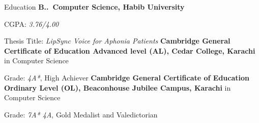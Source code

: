 \begin{rubric}{Education}
\entry*[2020 -- Present]%
	\textbf{B..~Computer Science, Habib University}\par
        CGPA: \emph{3.76/4.00} \par
        Thesis Title: \emph{LipSync Voice for Aphonia Patients }
\entry*[2018 -- 2020]%
	\textbf{Cambridge General Certificate of Education Advanced level (AL), Cedar College, Karachi} in Computer Science
	\par Grade: \emph{4A*}, High Achiever
\entry*[2015 -- 2018]%
	\textbf{Cambridge General Certificate of Education Ordinary Level (OL), Beaconhouse Jubilee Campus, Karachi} in Computer Science
	\par Grade: \emph{7A* 4A}, Gold Medalist and Valedictorian

% 
\end{rubric}